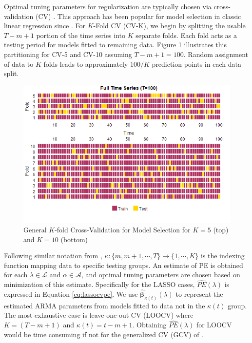 Optimal tuning parameters for regularization are typically chosen via cross-validation (CV) \citep{Hastie2009a}. This approach has been popular for model selection in classic linear regression since \cite{Stone1974}. For $K$-Fold CV (CV-K), we begin by splitting the usable $T-m+1$ portion of the time series into $K$ separate folds. Each fold acts as a testing period for models fitted to remaining data. Figure \ref{fig:kcvplots} illustrates this partitioning for CV-5 and CV-10 assuming $T-m+1=100$. Random assignment of data to $K$ folds leads to approximately $100/K$ prediction points in each data split.
\begin{figure}[htbp!]
	\caption{General $K$-fold Cross-Validation for Model Selection for $K=5$ (top) and $K=10$ (bottom)}
	\label{fig:kcvplots}
	\includegraphics[scale=0.7]{kcvplots}
\end{figure}

Following similar notation from \cite{Hastie2009a}, $\kappa:\{m,m+1,\cdots,T\}\to\{1,\cdots,K\}$ is the indexing function mapping data to specific testing groups. An estimate of PE is obtained for each $\lambda \in \mathcal{L}$ and $\alpha \in \mathcal{A}$, and optimal tuning parameters are chosen based on minimization of this estimate. Specifically for the LASSO cases, $\widehat{PE}(\lambda)$ is expressed in Equation \ref{eq:lassocvpe}. We use $\hat{\bm{\beta}}_{\kappa(t)}(\lambda)$ to represent the estimated ARMA parameters from models fitted to data not in the $\kappa(t)$ group. The most exhaustive case is leave-one-out CV (LOOCV) where $K=(T-m+1)$ and  $\kappa(t)=t-m+1$. Obtaining $\widehat{PE}(\lambda)$ for LOOCV would be time consuming if not for the generalized CV (GCV) of \cite{Wahba1978}.

